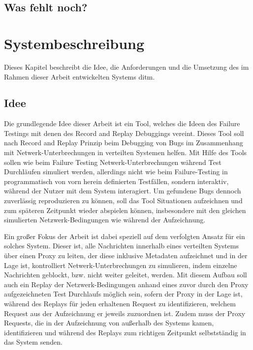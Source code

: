 \documentclass[12pt,a4paper]{report}
\begin{document}
\section{Was fehlt noch?}



\chapter{Systembeschreibung}
Dieses Kapitel beschreibt die Idee, die Anforderungen und die Umsetzung des im Rahmen dieser Arbeit entwickelten Systems ditm.
\section{Idee}
Die grundlegende Idee dieser Arbeit ist ein Tool, welches die Ideen des Failure Testings mit denen des Record and Replay
Debuggings vereint. Dieses Tool soll nach Record and Replay Prinzip beim Debugging von Bugs im Zusammenhang mit
Netwerk-Unterbrechungen in verteilten Systemen helfen. Mit Hilfe des Tools sollen wie beim Failure Testing Netwerk-Unterbrechungen
während Test Durchläufen simuliert werden, allerdings nicht wie beim Failure-Testing in programmatisch von vorn herein definierten
Testfällen, sondern interaktiv, während der Nutzer mit dem System interagiert. Um gefundene Bugs dennoch zuverlässig reproduzieren
zu können, soll das Tool Situationen aufzeichnen und zum späteren Zeitpunkt wieder abspielen können, insbesondere mit den gleichen
simulierten Netzwerk-Bedingungen wie während der Aufzeichnung.

Ein großer Fokus der Arbeit ist dabei speziell auf dem verfolgten Ansatz für ein solches System. Dieser ist, alle Nachrichten
innerhalb eines verteilten Systems über einen Proxy zu leiten, der diese inklusive Metadaten aufzeichnet und in der Lage ist,
kontrolliert Netwerk-Unterbrechungen zu simulieren, indem einzelne Nachrichten geblockt, bzw. nicht weiter geleitet, werden.  Mit
diesem Aufbau soll auch ein Replay der Netzwerk-Bedingungen anhand eines zuvor durch den Proxy aufgezeichneten Test Durchlaufs
möglich sein, sofern der Proxy in der Lage ist, während des Replays für jeden erhaltenen Request zu identifizieren, welchem
Request aus der Aufzeichnung er jeweils zuzuordnen ist. Zudem muss der Proxy Requests, die in der Aufzeichnung von außerhalb des
Systems kamen, identifizieren und während des Replays zum richtigen Zeitpunkt selbstständig in das System senden.
\end{document}
